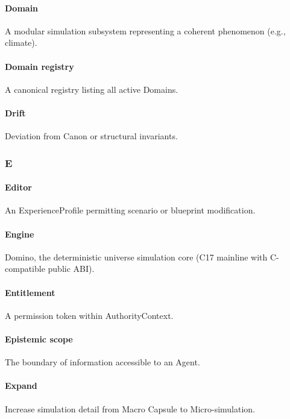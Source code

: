\documentclass[9pt,a4paper,openany]{book}
\begin{document}
\paragraph{Domain}
A modular simulation subsystem representing a coherent phenomenon (e.\allowbreak{}g.\allowbreak{}, climate).\allowbreak{}


\paragraph{Domain registry}
A canonical registry listing all active Domains.\allowbreak{}


\paragraph{Drift}
Deviation from Canon or structural invariants.\allowbreak{}


\subsubsection{E}

\paragraph{Editor}
An ExperienceProfile permitting scenario or blueprint modification.\allowbreak{}


\paragraph{Engine}
Domino, the deterministic universe simulation core (C17 mainline with C-\allowbreak{}compatible public ABI).\allowbreak{}


\paragraph{Entitlement}
A permission token within AuthorityContext.\allowbreak{}


\paragraph{Epistemic scope}
The boundary of information accessible to an Agent.\allowbreak{}


\paragraph{Expand}
Increase simulation detail from Macro Capsule to Micro-\allowbreak{}simulation.\allowbreak{}
\end{document}
